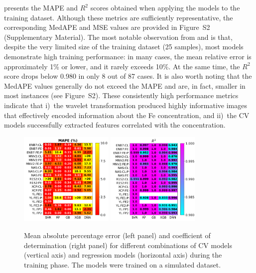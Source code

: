 \documentclass[10pt]{iopart}
\begin{document}
 presents the MAPE and $R^2$ scores obtained when applying the models to the training dataset. 
Although these metrics are sufficiently representative, the corresponding MedAPE and MSE values are provided in Figure~S2 (Supplementary Material). 
The most notable observation from  and  is that, 
despite the very limited size of the training dataset (25 samples), 
most models demonstrate high training performance: 
in many cases, the mean relative error is approximately 1\% or lower, 
and it rarely exceeds 10\%. At the same time, the $R^2$ score drops below 0.980 in only 8 out of 87 cases. 
It is also worth noting that the MedAPE values generally do not exceed the MAPE and are, in fact, 
smaller in most instances (see Figure~S2). 
These consistently high performance metrics indicate that 
i)~the wavelet transformation produced highly informative images that effectively encoded information about the Fe concentration, 
and ii)~the CV models successfully extracted features correlated with the concentration.

\begin{figure}
\centering
\includegraphics[width=0.4\textwidth]{Fig5a}
\includegraphics[width=0.4\textwidth]{Fig5b}
\caption{
Mean absolute percentage error (left panel) and coefficient of determination (right panel) for different combinations of CV models (vertical axis) 
and regression models (horizontal axis) during the training phase. The models were trained on a simulated dataset.
}\label{Fig5}
\end{figure}
\end{document}

